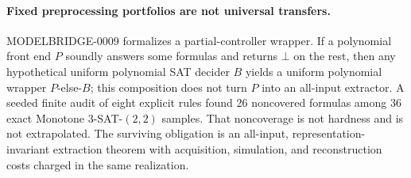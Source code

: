 \paragraph{Fixed preprocessing portfolios are not universal transfers.}
MODELBRIDGE-0009 formalizes a partial-controller wrapper.  If a polynomial
front end $P$ soundly answers some formulas and returns $\bot$ on the rest,
then any hypothetical uniform polynomial SAT decider $B$ yields a uniform
polynomial wrapper $P$-else-$B$; this composition does not turn $P$ into an
all-input extractor.  A seeded finite audit of eight explicit rules found 26
noncovered formulas among 36 exact Monotone $3$-SAT-$(2,2)$ samples.  That
noncoverage is not hardness and is not extrapolated.  The surviving obligation
is an all-input, representation-invariant extraction theorem with acquisition,
simulation, and reconstruction costs charged in the same realization.
